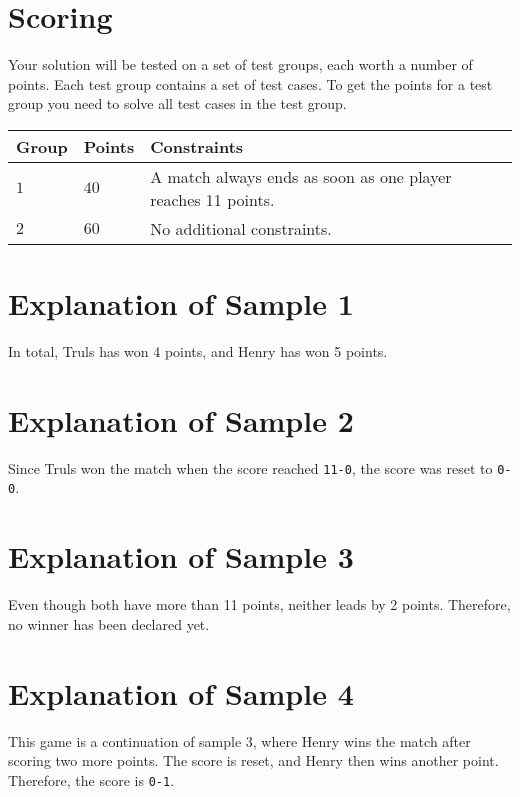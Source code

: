 \section*{Scoring}
Your solution will be tested on a set of test groups, each worth a number of points. Each test group contains
a set of test cases. To get the points for a test group you need to solve all test cases in the test group.

\noindent
\begin{tabular}{| l | l | p{12cm} |}
  \hline
  \textbf{Group} & \textbf{Points} & \textbf{Constraints} \\ \hline
  $1$    & $40$       & A match always ends as soon as one player reaches 11 points. \\ \hline
  $2$    & $60$       & No additional constraints. \\ \hline
\end{tabular}

\section*{Explanation of Sample 1}
In total, Truls has won 4 points, and Henry has won 5 points.

\section*{Explanation of Sample 2}
Since Truls won the match when the score reached \texttt{11-0}, the score was reset to \texttt{0-0}.

\section*{Explanation of Sample 3}
Even though both have more than 11 points, neither leads by 2 points. Therefore, no winner has been declared yet.

\section*{Explanation of Sample 4}
This game is a continuation of sample 3, where Henry wins the match after scoring two more points.  
The score is reset, and Henry then wins another point. Therefore, the score is \texttt{0-1}.

